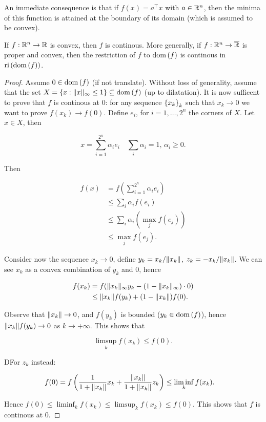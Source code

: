 An immediate consequence is that if $f(x) = a^\top x$ with $a \in {\mathbb{R}^n}$, then the minima of this function is attained at the boundary of its domain (which is assumed to be convex).

\begin{proposition}
    
    If $f : {\mathbb{R}^n} \to \mathbb{R}$ is convex, then $f$ is continous. More generally, if $f : {\mathbb{R}^n} \to \overline{\mathbb{R}}$ is proper and convex, then the restriction of $f$ to $\mathrm{dom}\left(f\right)$ is continous in $\mathrm{ri}\left(\mathrm{dom}\left(f\right)\right)$.

\end{proposition}

\begin{proof}
    
    Assume $0 \in \mathrm{dom}\left(f\right)$ (if not translate). Without loss of generality, assume that the set $X = \left\{ x : \lVert x \rVert_\infty \le 1 \right\} \subseteq \mathrm{dom}\left(f\right)$ (up to dilatation). It is now sufficent to prove that $f$ is continous at $0$: for any sequence $\left\{ x_k \right\}_k$ such that $x_k \to 0$ we want to prove $f(x_k) \to f(0)$. Define $e_i$, for $i = 1,\dots,2^n$ the corners of $X$. Let $x \in X$, then 

    \[ x = \sum_{i=1}^{2^n} \alpha_i e_i\quad \sum_i \alpha_i = 1, \, \alpha_i \ge 0. \]

    Then 

    \begin{align*}
        f(x) &= f\left(\sum_{i=1}^{2^n} \alpha_i e_i\right) \\
            &\le \sum_i \alpha_i f(e_i) \\
            &\le \sum_i \alpha_i \left(\max_j f(e_j)\right) \\
            &\le \max_j f(e_j).
    \end{align*}

    Consider now the sequence $x_k \to 0$, define $y_k = x_k/\lVert x_k \rVert$, $z_k = -x_k/\lVert x_k \rVert$. We can see $x_k$ as a convex combination of $y_k$ and 0, hence 

    \begin{align*}
        f(x_k) &= f(\lVert x_k \rVert_\infty y_k - (1-\lVert x_k \rVert_\infty)\cdot 0) \\ 
            &\le \lVert x_k \rVert f(y_k) + (1-\lVert x_k \rVert)f(0).
    \end{align*}

    Observe that $\lVert x_k \rVert \to 0$, and $f(y_k)$ is bounded ($y_k \in \mathrm{dom}\left(f\right)$), hence $\lVert x_k \rVert f(y_k) \to 0$ as $k \to +\infty$. This shows that 

    \[ \limsup_k f(x_k) \le f(0). \]

    DFor $z_k$ instead:

    \begin{align*}
        f(0) &= f\left(\frac{1}{1+\lVert x_k \rVert}x_k + \frac{\lVert x_k \rVert}{1+\lVert x_k \rVert}z_k\right) \le \liminf_k f(x_k).
    \end{align*}

    Hence $f(0) \le \liminf_k f(x_k) \le \limsup_k f(x_k) \le f(0)$. This shows that $f$ is continous at 0.

\end{proof}

